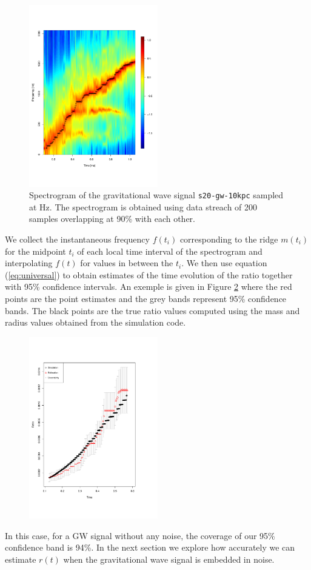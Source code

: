 \begin{figure}
 \centering
 \includegraphics[width=0.5\textwidth,height=0.3\textheight]{plots/spectrogram}
 \caption{Spectrogram of the gravitational wave signal {\tt s20-gw-10kpc} sampled at \unit[4096]{Hz}.
   The spectrogram is obtained using data streach of 200 samples overlapping at 90\%
   with each other.} \label{fig:spectrogram}
\end{figure}


We collect the instantaneous frequency $f(t_i)$ corresponding to the ridge $m(t_i)$ for
the midpoint $t_i$ of each local time interval of the spectrogram and interpolating $f(t)$
for values in between the $t_i$. We then use equation (\ref{eq:universal}) to obtain
estimates of the time evolution of the ratio together with 95\% confidence intervals.
An exemple is given in Figure \ref{fig:ratio} where the red points are the point estimates and
the grey bands represent 95\% confidence bands. The black points are the true ratio values
computed using the mass and radius values obtained from the simulation code. 

\begin{figure}
 \centering
 \includegraphics[width=0.5\textwidth,height=0.3\textheight]{plots/ratio}
 \caption{} \label{fig:ratio}
\end{figure}


In this case, for a GW signal without any noise, the coverage of our 95\% confidence band is 94\%.
In the next section we explore how accurately we can estimate $r(t)$ when the gravitational wave
signal is embedded in noise.






